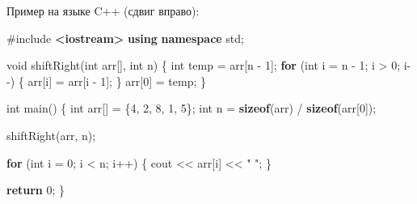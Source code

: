 \documentclass[
]{article}
\newenvironment{Shaded}{}{}
\newcommand{\ControlFlowTok}[1]{\textcolor[rgb]{0.00,0.44,0.13}{\textbf{#1}}}
\newcommand{\DataTypeTok}[1]{\textcolor[rgb]{0.56,0.13,0.00}{#1}}
\newcommand{\DecValTok}[1]{\textcolor[rgb]{0.25,0.63,0.44}{#1}}
\newcommand{\ImportTok}[1]{\textcolor[rgb]{0.00,0.50,0.00}{\textbf{#1}}}
\newcommand{\KeywordTok}[1]{\textcolor[rgb]{0.00,0.44,0.13}{\textbf{#1}}}
\newcommand{\NormalTok}[1]{#1}
\newcommand{\OperatorTok}[1]{\textcolor[rgb]{0.40,0.40,0.40}{#1}}
\newcommand{\PreprocessorTok}[1]{\textcolor[rgb]{0.74,0.48,0.00}{#1}}
\newcommand{\StringTok}[1]{\textcolor[rgb]{0.25,0.44,0.63}{#1}}
\begin{document}
Пример на языке C++ (сдвиг вправо):

\begin{Shaded}
\begin{Highlighting}[]
\PreprocessorTok{\#include }\ImportTok{\textless{}iostream\textgreater{}}
\KeywordTok{using} \KeywordTok{namespace}\NormalTok{ std}\OperatorTok{;}

\DataTypeTok{void}\NormalTok{ shiftRight}\OperatorTok{(}\DataTypeTok{int}\NormalTok{ arr}\OperatorTok{[],} \DataTypeTok{int}\NormalTok{ n}\OperatorTok{)} \OperatorTok{\{}
    \DataTypeTok{int}\NormalTok{ temp }\OperatorTok{=}\NormalTok{ arr}\OperatorTok{[}\NormalTok{n }\OperatorTok{{-}} \DecValTok{1}\OperatorTok{];}
    \ControlFlowTok{for} \OperatorTok{(}\DataTypeTok{int}\NormalTok{ i }\OperatorTok{=}\NormalTok{ n }\OperatorTok{{-}} \DecValTok{1}\OperatorTok{;}\NormalTok{ i }\OperatorTok{\textgreater{}} \DecValTok{0}\OperatorTok{;}\NormalTok{ i}\OperatorTok{{-}{-})} \OperatorTok{\{}
\NormalTok{        arr}\OperatorTok{[}\NormalTok{i}\OperatorTok{]} \OperatorTok{=}\NormalTok{ arr}\OperatorTok{[}\NormalTok{i }\OperatorTok{{-}} \DecValTok{1}\OperatorTok{];}
    \OperatorTok{\}}
\NormalTok{    arr}\OperatorTok{[}\DecValTok{0}\OperatorTok{]} \OperatorTok{=}\NormalTok{ temp}\OperatorTok{;}
\OperatorTok{\}}

\DataTypeTok{int}\NormalTok{ main}\OperatorTok{()} \OperatorTok{\{}
    \DataTypeTok{int}\NormalTok{ arr}\OperatorTok{[]} \OperatorTok{=} \OperatorTok{\{}\DecValTok{4}\OperatorTok{,} \DecValTok{2}\OperatorTok{,} \DecValTok{8}\OperatorTok{,} \DecValTok{1}\OperatorTok{,} \DecValTok{5}\OperatorTok{\};}
    \DataTypeTok{int}\NormalTok{ n }\OperatorTok{=} \KeywordTok{sizeof}\OperatorTok{(}\NormalTok{arr}\OperatorTok{)} \OperatorTok{/} \KeywordTok{sizeof}\OperatorTok{(}\NormalTok{arr}\OperatorTok{[}\DecValTok{0}\OperatorTok{]);}

\NormalTok{    shiftRight}\OperatorTok{(}\NormalTok{arr}\OperatorTok{,}\NormalTok{ n}\OperatorTok{);}

    \ControlFlowTok{for} \OperatorTok{(}\DataTypeTok{int}\NormalTok{ i }\OperatorTok{=} \DecValTok{0}\OperatorTok{;}\NormalTok{ i }\OperatorTok{\textless{}}\NormalTok{ n}\OperatorTok{;}\NormalTok{ i}\OperatorTok{++)} \OperatorTok{\{}
\NormalTok{        cout }\OperatorTok{\textless{}\textless{}}\NormalTok{ arr}\OperatorTok{[}\NormalTok{i}\OperatorTok{]} \OperatorTok{\textless{}\textless{}} \StringTok{" "}\OperatorTok{;}
    \OperatorTok{\}}

    \ControlFlowTok{return} \DecValTok{0}\OperatorTok{;}
\OperatorTok{\}}
\end{Highlighting}
\end{Shaded}
\end{document}
